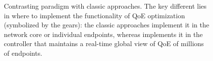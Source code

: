 \begin{figure}[t!]
\captionsetup[subfigure]{justification=centering,farskip=-1pt,captionskip=5pt}
\centering
\caption{Contrasting \ddn paradigm with classic approaches. 
The key different lies in where to implement the functionality of QoE optimization (symbolized by the gears): the classic approaches implement 
it in the network core or individual endpoints, whereas \ddn implements 
it in the controller that maintains a real-time global view of QoE of millions of endpoints.}
\vspace{-0.1cm}
\label{fig:intro:contrast}
\end{figure}

